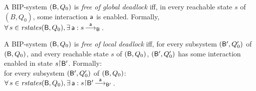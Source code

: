 

\begin{definition}
\label{def:static:deadlock-free}
\label{def:global.deadlock-free} 
\label{defn:static:deadlock-free}
\label{defn:global.deadlock-free} 
A BIP-system $(\mathsf{B}, Q_0)$ is \emph{free of global deadlock} iff,
in every reachable state $s$ of $(B, Q_0)$, some interaction $\mathsf{a}$ is enabled.
Formally, $\forall\, s \in \mathit{rstates}(\mathsf{B},Q_0), \exists\, \mathsf{a} : s \mbox{$\, \stackrel{\mathsf{a}}{\longrightarrow}_{\mathsf{B}} \,$}$.
\end{definition}


\begin{definition}
\label{def:local.deadlock-free} 
\label{defn:local.deadlock-free} 
A BIP-system $(\mathsf{B}, Q_0)$ is \emph{free of local deadlock} iff, 
for every subsystem $(\mathsf{B}', Q'_0)$ of  $(\mathsf{B}, Q_0)$, and every reachable state $s$ of $(\mathsf{B}, Q_0)$,
$(\mathsf{B}', Q'_0)$ has some interaction enabled in state $s \pj \B'$.
Formally:\\
\ind for every subsystem $(\mathsf{B}', Q'_0)$ of  $(\mathsf{B}, Q_0)$:\\
\ind \ind $\fa s \in \rstates{\B,Q_0},  \ex \act : s \pj \B' \enb{\act}{\B'}$.
\end{definition}



